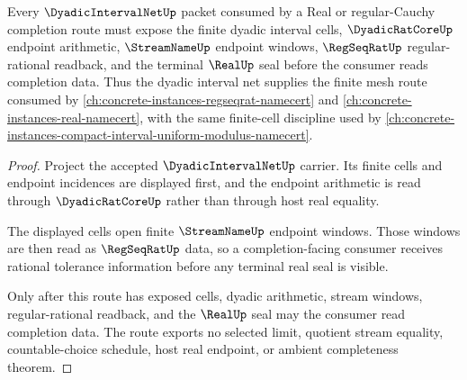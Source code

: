 \begin{theorem}
\label{thm:dyadic-interval-net-real-completion-route}
Every $\DyadicIntervalNetUp$ packet consumed by a Real or regular-Cauchy completion route must expose the finite dyadic interval cells, $\DyadicRatCoreUp$ endpoint arithmetic, $\StreamNameUp$ endpoint windows, $\RegSeqRatUp$ regular-rational readback, and the terminal $\RealUp$ seal before the consumer reads completion data. Thus the dyadic interval net supplies the finite mesh route consumed by \autoref{ch:concrete-instances-regseqrat-namecert} and \autoref{ch:concrete-instances-real-namecert}, with the same finite-cell discipline used by \autoref{ch:concrete-instances-compact-interval-uniform-modulus-namecert}.
\end{theorem}
\begin{proof}
Project the accepted $\DyadicIntervalNetUp$ carrier. Its finite cells and endpoint incidences are displayed first, and the endpoint arithmetic is read through $\DyadicRatCoreUp$ rather than through host real equality.

The displayed cells open finite $\StreamNameUp$ endpoint windows. Those windows are then read as $\RegSeqRatUp$ data, so a completion-facing consumer receives rational tolerance information before any terminal real seal is visible.

Only after this route has exposed cells, dyadic arithmetic, stream windows, regular-rational readback, and the $\RealUp$ seal may the consumer read completion data. The route exports no selected limit, quotient stream equality, countable-choice schedule, host real endpoint, or ambient completeness theorem.
\end{proof}
